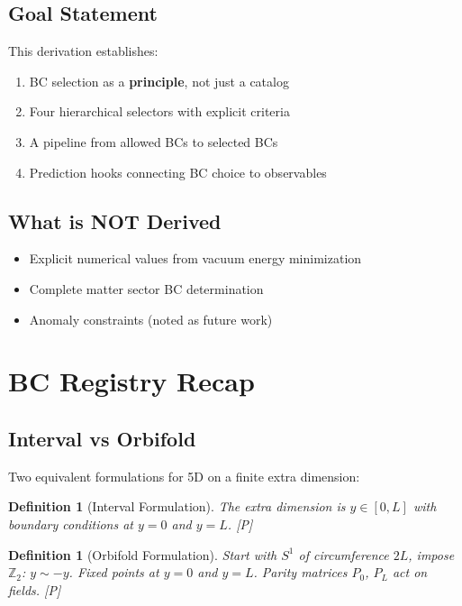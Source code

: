 \documentclass[11pt,a4paper]{article}
\newtheorem{definition}[theorem]{Definition}
\newcommand{\tagP}{\textcolor{green!50!black}{[P]}}
\begin{document}
\subsection{Goal Statement}
This derivation establishes:
\begin{enumerate}
    \item BC selection as a \textbf{principle}, not just a catalog
    \item Four hierarchical selectors with explicit criteria
    \item A pipeline from allowed BCs to selected BCs
    \item Prediction hooks connecting BC choice to observables
\end{enumerate}

\subsection{What is NOT Derived}
\begin{itemize}
    \item Explicit numerical values from vacuum energy minimization
    \item Complete matter sector BC determination
    \item Anomaly constraints (noted as future work)
\end{itemize}

\section{BC Registry Recap}

\subsection{Interval vs Orbifold}

Two equivalent formulations for 5D on a finite extra dimension:

\begin{definition}[Interval Formulation]
\label{def:interval}
The extra dimension is $y \in [0, L]$ with boundary conditions at $y = 0$ and $y = L$. \tagP
\end{definition}

\begin{definition}[Orbifold Formulation]
\label{def:orbifold}
Start with $S^1$ of circumference $2L$, impose $\mathbb{Z}_2$: $y \sim -y$.
Fixed points at $y = 0$ and $y = L$. Parity matrices $P_0$, $P_L$ act on fields. \tagP
\end{definition}
\end{document}
